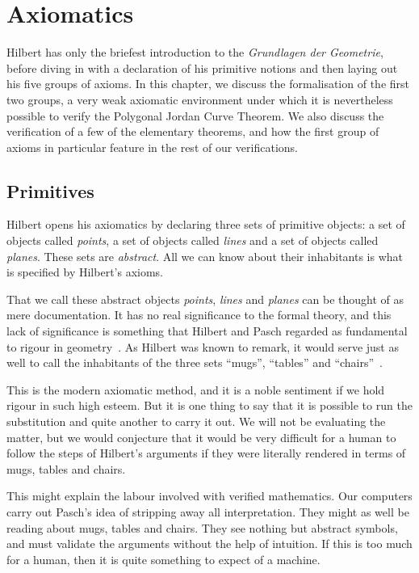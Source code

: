 \chapter{Axiomatics}\label{chapter:Axiomatics}
Hilbert has only the briefest introduction to the \emph{Grundlagen der Geometrie}, before diving in with a declaration of his primitive notions and then laying out his five groups of axioms. In this chapter, we discuss the formalisation of the first two groups, a very weak axiomatic environment under which it is nevertheless possible to verify the Polygonal Jordan Curve Theorem. We also discuss the verification of a few of the elementary theorems, and how the first group of axioms in particular feature in the rest of our verifications.

\section{Primitives}
Hilbert opens his axiomatics by declaring three sets of primitive objects: a set of objects called \emph{points}, a set of objects called \emph{lines} and a set of objects called \emph{planes}. These sets are \emph{abstract}. All we can know about their inhabitants is what is specified by Hilbert's axioms.

That we call these abstract objects \emph{points}, \emph{lines} and \emph{planes} can be thought of as mere documentation. It has no real significance to the formal theory, and this lack of significance is something that Hilbert and Pasch regarded as fundamental to rigour in geometry~\cite{TableChairMug}. As Hilbert was known to remark, it would serve just as well to call the inhabitants of the three sets ``mugs'', ``tables'' and ``chairs''~\cite{PaschToPeano}.

This is the modern axiomatic method, and it is a noble sentiment if we hold rigour in such high esteem. But it is one thing to say that it is possible to run the substitution and quite another to carry it out. We will not be evaluating the matter, but we would conjecture that it would be very difficult for a human to follow the steps of Hilbert's arguments if they were literally rendered in terms of mugs, tables and chairs.

This might explain the labour involved with verified mathematics. Our computers carry out Pasch's idea of stripping away all interpretation. They might as well be reading about mugs, tables and chairs. They see nothing but abstract symbols, and must validate the arguments without the help of intuition. If this is too much for a human, then it is quite something to expect of a machine.

